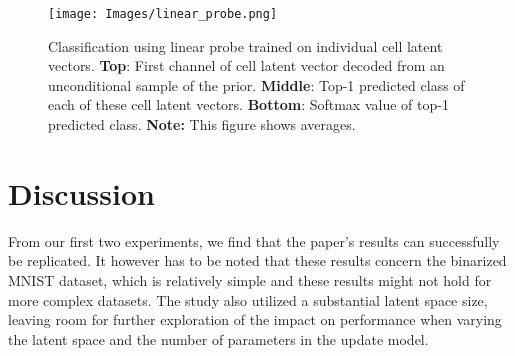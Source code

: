 \begin{figure}[ht]
    \centering
    \texttt{[image: Images/linear\_probe.png]}
    \caption{Classification using linear probe trained on individual cell latent vectors. \textbf{Top}: First channel of cell latent vector decoded from an unconditional sample of the prior. \textbf{Middle}: Top-1 predicted class of each of these cell latent vectors. \textbf{Bottom}: Softmax value of top-1 predicted class. 
 \textbf{Note:} This figure shows averages.}
    \label{fig:linear_probe}
\end{figure}





 

\section{Discussion}


From our first two experiments, we find that the paper's results can successfully be replicated. It however has to be noted that these results concern the binarized MNIST dataset, which is relatively simple and these results might not hold for more complex datasets.
The study also utilized a substantial latent space size, leaving room for further exploration of the impact on performance when varying the latent space and the number of parameters in the update model.\\  %

